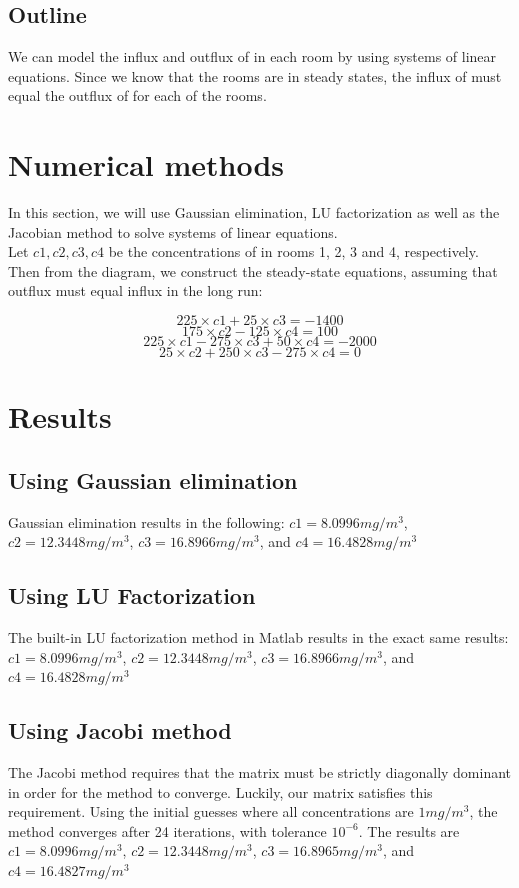 \documentclass[openany]{book}
\begin{document}
	\subsection{Outline}
	We can model the influx and outflux of  in each room by using systems of linear equations. Since we know that the rooms are in steady states, the influx of  must equal the outflux of  for each of the rooms.
	
	\section{Numerical methods}
	In this section, we will use Gaussian elimination, LU factorization as well as the Jacobian method to solve systems of linear equations.\\
	
	Let ${c1, c2, c3, c4}$ be the concentrations of  in rooms 1, 2, 3 and 4, respectively. Then from the diagram, we construct the steady-state equations, assuming that outflux must equal influx in the long run:
	
	\[225{\times}c1 + 25{\times}c3 = -1400\]
	\[175{\times}c2 - 125{\times}c4 = 100\]
	\[225{\times}c1 - 275{\times}c3 + 50{\times}c4 = -2000\]
	\[25{\times}c2 + 250{\times}c3 - 275{\times}c4 = 0\]
	
	\section{Results}
    
    \subsection{Using Gaussian elimination}
    Gaussian elimination results in the following:
    ${c1 = 8.0996 mg/m^3}$, ${c2 = 12.3448 mg/m^3}$, ${c3 = 16.8966 mg/m^3}$, and ${c4 = 16.4828 mg/m^3}$
    \subsection{Using LU Factorization}
    The built-in LU factorization method in Matlab results in the exact same results:
    ${c1 = 8.0996 mg/m^3}$, ${c2 = 12.3448 mg/m^3}$, ${c3 = 16.8966 mg/m^3}$, and ${c4 = 16.4828 mg/m^3}$
    \subsection{Using Jacobi method}
    The Jacobi method requires that the matrix must be strictly diagonally dominant in order for the method to converge. Luckily, our matrix satisfies this requirement. Using the initial guesses where all concentrations are ${1 mg/m^3}$, the method converges after 24 iterations, with tolerance ${10^{-6}}$. The results are  ${c1 = 8.0996 mg/m^3}$, ${c2 = 12.3448 mg/m^3}$, ${c3 = 16.8965 mg/m^3}$, and ${c4 = 16.4827 mg/m^3}$
\end{document}
